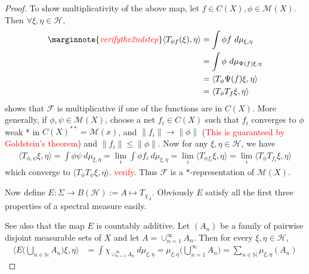 \begin{proof}
  To show multiplicativity of the above map, let $f \in C(X), \phi
  \in \mathcal{M}(X)$. Then $\forall \xi, \eta \in
  \mathcal{H}$,
  \begin{align*}
    \marginnote{ \scriptsize \it \textcolor{red}{verify the 2nd step}}
    \langle T_{\phi f}(\xi), \eta \rangle  &= \int \phi f \ d \mu_{\xi, \eta} \\
    &= \int \phi \ d \mu_{\Psi(f) \xi, \eta} \\
    &= \langle T_\phi \Psi(f) \xi ,  \eta \rangle\\
    &= \langle  T_\phi T_f \xi ,  \eta \rangle
  \end{align*}
  shows that $\mathscr{F}$ is multiplicative if one of the functions
  are in $C(X)$.
  More generally, if $\phi, \psi \in \mathcal{M}(X)$, choose a net
  $f_i \in C(X)$  such that $f_i$ converges to $\phi$ weak * in
  $C(X)^{**} = \mathcal{M}(x)$, and $\|f_i\| \to \|\phi\|$
  (\textcolor{red}{This is
      guaranteed by Goldstein's
  theorem}) and $\|f_i\| \le \|\phi\|$. Now for any $\xi, \eta \in
  \mathcal{H}$, we have
  \begin{align*}
    \langle T_{\phi, \psi} \xi ,  \eta \rangle = \int \phi \psi \ d
    \mu_{\xi, \eta} = \lim_{i} \int \phi f_i \ d \mu_{\xi, \eta} =
    \lim_i \langle T_{\phi f_i} \xi ,  \eta \rangle = \lim_i \langle
    T_\phi T_{f_i} \xi , \eta \rangle
  \end{align*}
  which converge to $\langle T_\phi T_\psi \xi ,  \eta \rangle$.
  \textcolor{red}{verify}. Thus $\mathscr{F}$ is a $*$-representation
  of $\mathcal{M}(X)$.

  Now define $E : \Sigma \to  B(\mathcal{H}) :=   A \mapsto
  T_{\chi_A}$. Obviously $E$ satisfy all the first three properties
  of a spectral measure easily.

  See also that the map $E$ is countably additive. Let $(A_n)$ be a
  family of pairwise disjoint measurable sets of $X$
  and let $A = \cup_{n = 1}^{\infty}A_n$. Then for every $\xi, \eta
  \in \mathcal{H}$,
  \begin{align*}
    \Big \langle E \big(\bigcup_{n \in \mathbb{N}} A_n \big) \xi ,
    \eta \Big \rangle &= \int  \chi_{\cup_{n = 1}^{\infty}A_n} \ d
    \mu_{ \xi, \eta} = \mu_{\xi, \eta}\Big( \bigcup_{n =
    1}^{\infty}A_n \Big) = \sum_{n \in \mathbb{N}} \mu_{\xi , \eta}(A_n)
  \end{align*}

\end{proof}
